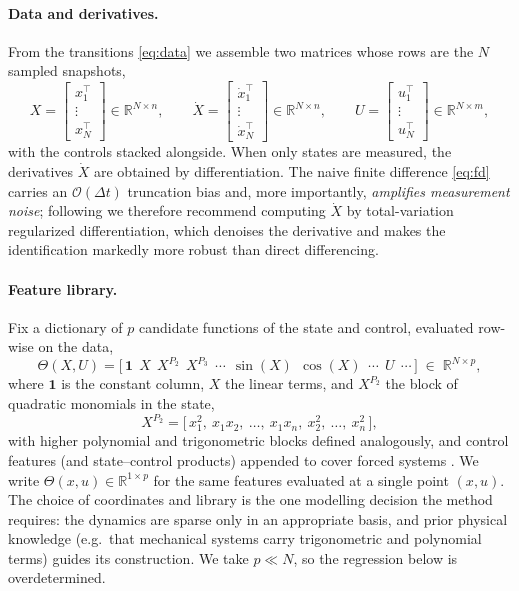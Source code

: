 \documentclass{article}
\newcommand{\R}{\mathbb{R}}
\newcommand{\Dict}{\Theta}
\begin{document}
\paragraph{Data and derivatives.}
From the transitions \eqref{eq:data} we assemble two matrices whose rows are the
$N$ sampled snapshots,
\[
    X = \begin{bmatrix} x_1^\top\\ \vdots\\ x_N^\top \end{bmatrix}\in\R^{N\times n},
    \qquad
    \dot X = \begin{bmatrix} \dot x_1^\top\\ \vdots\\ \dot x_N^\top \end{bmatrix}\in\R^{N\times n},
    \qquad
    U = \begin{bmatrix} u_1^\top\\ \vdots\\ u_N^\top \end{bmatrix}\in\R^{N\times m},
\]
with the controls stacked alongside. When only states are measured, the
derivatives $\dot X$ are obtained by differentiation. The naive finite difference
\eqref{eq:fd} carries an $\mathcal{O}(\Delta t)$ truncation bias and, more
importantly, \emph{amplifies measurement noise}; following
\citet{brunton2016discovering} we therefore recommend computing $\dot X$ by
total-variation regularized differentiation, which denoises the derivative and
makes the identification markedly more robust than direct differencing.

\paragraph{Feature library.}
Fix a dictionary of $p$ candidate functions of the state and control, evaluated
row-wise on the data,
\[
    \Dict(X,U)=
    \bigl[\, \mathbf{1}\ \ X\ \ X^{P_2}\ \ X^{P_3}\ \ \cdots\ \ \sin(X)\ \ \cos(X)\ \ \cdots\ \ U\ \ \cdots \,\bigr]
    \;\in\;\R^{N\times p},
\]
where $\mathbf{1}$ is the constant column, $X$ the linear terms, and $X^{P_2}$ the
block of quadratic monomials in the state,
\[
    X^{P_2}=\bigl[\,x_1^2,\ x_1 x_2,\ \dots,\ x_1 x_n,\ x_2^2,\ \dots,\ x_n^2\,\bigr],
\]
with higher polynomial and trigonometric blocks defined analogously, and control
features (and state--control products) appended to cover forced systems
\citep{brunton2016discovering}. We write $\Dict(x,u)\in\R^{1\times p}$ for the
same features evaluated at a single point $(x,u)$. The choice of coordinates and
library is the one modelling decision the method requires: the dynamics are sparse
only in an appropriate basis, and prior physical knowledge (e.g.\ that mechanical
systems carry trigonometric and polynomial terms) guides its construction. We take
$p\ll N$, so the regression below is overdetermined.
\end{document}
